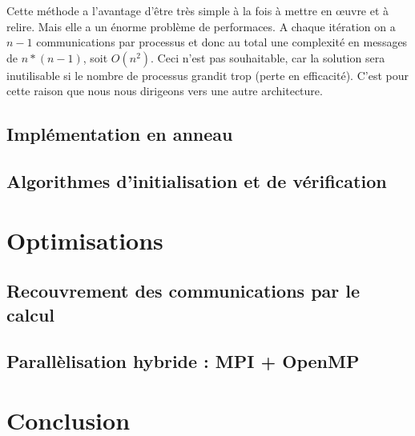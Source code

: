 \documentclass[a4paper]{article}
\begin{document}
Cette méthode a l'avantage d'être très simple à la fois à mettre
en \oe uvre et à relire. Mais elle a un énorme problème de
performaces. A chaque itération on a $n - 1$ communications par
processus et donc au total une complexité en messages de $n*(n - 1)$,
soit $O(n^2)$. Ceci n'est pas souhaitable, car la solution sera
inutilisable si le nombre de processus grandit trop (perte en
efficacité). C'est pour cette raison que nous nous dirigeons vers une
autre architecture.


\subsection{Implémentation en anneau}

\subsection{Algorithmes d'initialisation et de vérification}

\section{Optimisations}

\subsection{Recouvrement des communications par le calcul}

\subsection{Parallèlisation hybride : MPI + OpenMP}

\section{Conclusion}
\end{document}
